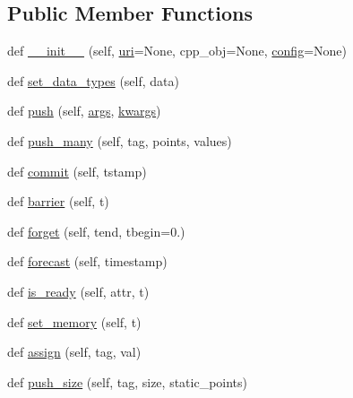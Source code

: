\subsection*{Public Member Functions}
\begin{DoxyCompactItemize}
\item 
def \hyperlink{classmui4py_1_1mui4py_1_1_uniface_a184ceb4f09c11cc67d57795b10cc42d1}{\+\_\+\+\_\+init\+\_\+\+\_\+} (self, \hyperlink{classmui4py_1_1mui4py_1_1_uniface_a0966f7e27032d2f5df4f308e5ede03f3}{uri}=None, cpp\+\_\+obj=None, \hyperlink{classmui4py_1_1common_1_1_cpp_class_ac0ad2501063d600bb0101a269a817ce8}{config}=None)
\item 
def \hyperlink{classmui4py_1_1mui4py_1_1_uniface_a2e4114d88901cb7ab07e16ffcc433ae4}{set\+\_\+data\+\_\+types} (self, data)
\item 
def \hyperlink{classmui4py_1_1mui4py_1_1_uniface_a225028981095b167636c74095c64821c}{push} (self, \hyperlink{classmui4py_1_1common_1_1_cpp_class_a29797823c6e21f22bba24ee7d35ef31d}{args}, \hyperlink{classmui4py_1_1common_1_1_cpp_class_af43879f06f07b1abf0d08e30c5ead46f}{kwargs})
\item 
def \hyperlink{classmui4py_1_1mui4py_1_1_uniface_a306530f3cea0435927542417c549f2dd}{push\+\_\+many} (self, tag, points, values)
\item 
def \hyperlink{classmui4py_1_1mui4py_1_1_uniface_a4a67a9107ea154cbdd6d91bdd5b3a764}{commit} (self, tstamp)
\item 
def \hyperlink{classmui4py_1_1mui4py_1_1_uniface_abc41698d32d670f2cb8def129f2165ab}{barrier} (self, t)
\item 
def \hyperlink{classmui4py_1_1mui4py_1_1_uniface_aca6bba86673d6e0702ea580d3daa2b6f}{forget} (self, tend, tbegin=0.)
\item 
def \hyperlink{classmui4py_1_1mui4py_1_1_uniface_a6398d75a8de1164045c8a5210523043e}{forecast} (self, timestamp)
\item 
def \hyperlink{classmui4py_1_1mui4py_1_1_uniface_afa5fe001b1774f40f8636a7723b9c838}{is\+\_\+ready} (self, attr, t)
\item 
def \hyperlink{classmui4py_1_1mui4py_1_1_uniface_a7115522afa82e5d386d1ee1383a35e16}{set\+\_\+memory} (self, t)
\item 
def \hyperlink{classmui4py_1_1mui4py_1_1_uniface_ab67c5123453069f9b1d21775032baf9d}{assign} (self, tag, val)
\item 
def \hyperlink{classmui4py_1_1mui4py_1_1_uniface_ad1ac4594cbe730d00ac740a4c8a35673}{push\+\_\+size} (self, tag, size, static\+\_\+points)
\item 

\end{DoxyCompactItemize}
